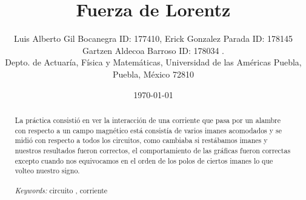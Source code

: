 \documentclass{article}
\begin{document}

\renewcommand{\footrulewidth}{1pt}
\renewcommand{\tablename}{Tabla}
\renewcommand{\figurename}{Figura}


\title{Fuerza de Lorentz}
\author{\small{Luis Alberto Gil Bocanegra ID: 177410, Erick Gonzalez Parada ID: 178145}\\
 \small{Gartzen Aldecoa Barroso ID: 178034 .}\\		%
	   \small{Depto. de Actuaría, Física y Matemáticas, Universidad de las Américas Puebla, Puebla, M\'exico 72810}}
\date{\small{\today}}

\maketitle


\begin{abstract}
La práctica consistió en ver la interacción de una corriente que pasa por un alambre con respecto a un campo magnético
está consistía de varios imanes acomodados y se midió con respecto a todos los circuitos, como cambiaba si restábamos imanes
y nuestros resultados fueron correctos, el comportamiento de las gráficas fueron correctas excepto cuando nos equivocamos en el orden
de los polos de ciertos imanes lo que volteo nuestro signo.
\\
\\
{\it Keywords:} circuito , corriente  
\\
\\
\end{abstract}
\end{document}
